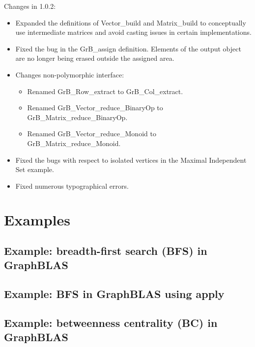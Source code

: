 Changes in 1.0.2:
\begin{itemize}
\item Expanded the definitions of {\sf Vector\_build} and {\sf Matrix\_build} to conceptually use intermediate matrices and avoid casting issues in certain implementations.
\item Fixed the bug in the {\sf GrB\_assign} definition. Elements of the output object are no longer being erased outside the assigned area.
\item Changes non-polymorphic interface:
    \begin{itemize}
    \item Renamed {\sf GrB\_Row\_extract} to {\sf GrB\_Col\_extract}.
    \item Renamed {\sf GrB\_Vector\_reduce\_BinaryOp} to {\sf GrB\_Matrix\_reduce\_BinaryOp}.
    \item Renamed {\sf GrB\_Vector\_reduce\_Monoid} to {\sf GrB\_Matrix\_reduce\_Monoid}.
    \end{itemize}
\item Fixed the bugs with respect to isolated vertices in the Maximal Independent Set example.
\item Fixed numerous typographical errors.
\end{itemize}  

\chapter{Examples}
\label{Chp:Examples}

\pagebreak
\nolinenumbers
\section{Example: breadth-first search (BFS) in GraphBLAS}
{\scriptsize

}
\vfill

\pagebreak
\nolinenumbers
\section{Example: BFS in GraphBLAS using apply}
{\scriptsize

}

\pagebreak
\nolinenumbers
\section{Example: betweenness centrality (BC) in GraphBLAS}
\label{App:BCnobatch}
{\scriptsize

}

